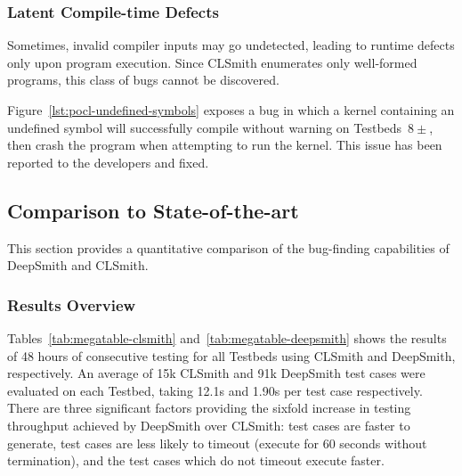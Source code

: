 \subsubsection{Latent Compile-time Defects}

Sometimes, invalid compiler inputs may go undetected, leading to runtime defects only upon program execution. Since CLSmith enumerates only well-formed programs, this class of bugs cannot be discovered.

Figure~\ref{lst:pocl-undefined-symbols} exposes a bug in which a kernel containing an undefined symbol will successfully compile without warning on Testbeds~$8\pm$, then crash the program when attempting to run the kernel. This issue has been reported to the developers and fixed.


\subsection{Comparison to State-of-the-art}

This section provides a quantitative comparison of the bug-finding capabilities of DeepSmith and CLSmith.


\subsubsection{Results Overview}

Tables~\ref{tab:megatable-clsmith} and~\ref{tab:megatable-deepsmith} shows the results of 48 hours of consecutive testing for all Testbeds using CLSmith and DeepSmith, respectively. An average of 15k CLSmith and 91k DeepSmith test cases were evaluated on each Testbed, taking 12.1s and 1.90s per test case respectively. There are three significant factors providing the sixfold increase in testing throughput achieved by DeepSmith over CLSmith: test cases are faster to generate, test cases are less likely to timeout (execute for 60 seconds without termination), and the test cases which do not timeout execute faster.

\begin{table}
	\centering %
	\caption[Results from 48 hours of testing using CLSmith]{%
		Results from 48 hours of testing using CLSmith. System \#. as per Table~\ref{tab:deepsmith-platforms}. $\pm$ denotes optimisations off ($-$) vs on ($+$). The remaining columns denote the number of build crash (\bc), build timeout (\bto), anomalous build failure (\abf), anomalous runtime crash (\arc), anomalous wrong-output (\awo), and pass (\textbf{\cmark}) results.
	}
	
	\label{tab:megatable-clsmith}
\end{table}

